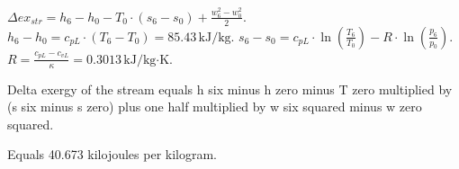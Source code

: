 \( \Delta ex_{str} = h_6 - h_0 - T_0 \cdot (s_6 - s_0) + \frac{w_6^2 - w_0^2}{2} \).  
\( h_6 - h_0 = c_{pL} \cdot (T_6 - T_0) = 85.43 \, \text{kJ/kg} \).  
\( s_6 - s_0 = c_{pL} \cdot \ln \left( \frac{T_6}{T_0} \right) - R \cdot \ln \left( \frac{p_6}{p_0} \right) \).  
\( R = \frac{c_{pL} - c_{vL}}{\kappa} = 0.3013 \, \text{kJ/kg·K} \).

Delta exergy of the stream equals h six minus h zero minus T zero multiplied by (s six minus s zero) plus one half multiplied by w six squared minus w zero squared.  

Equals 40.673 kilojoules per kilogram.